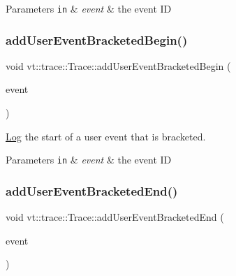 \begin{DoxyParams}[1]{Parameters}
\mbox{\tt in}  & {\em event} & the event ID \\
\hline
\end{DoxyParams}
\mbox{\label{structvt_1_1trace_1_1_trace_a1264ea508298bfeb6a6ef5e06d9214f9}} 
\subsubsection{\texorpdfstring{add\+User\+Event\+Bracketed\+Begin()}{addUserEventBracketedBegin()}}
{\footnotesize\ttfamily void vt\+::trace\+::\+Trace\+::add\+User\+Event\+Bracketed\+Begin (\begin{DoxyParamCaption}\item[{\hyperlink{namespacevt_1_1trace_a5908920d051c144c89f17c69ed262350}{User\+Event\+I\+D\+Type}}]{event }\end{DoxyParamCaption})}



\hyperlink{structvt_1_1trace_1_1_log}{Log} the start of a user event that is bracketed. 


\begin{DoxyParams}[1]{Parameters}
\mbox{\tt in}  & {\em event} & the event ID \\
\hline
\end{DoxyParams}
\mbox{\label{structvt_1_1trace_1_1_trace_a9ed44cd0fb5939013ae30de2aeb8aa0e}} 
\subsubsection{\texorpdfstring{add\+User\+Event\+Bracketed\+End()}{addUserEventBracketedEnd()}}
{\footnotesize\ttfamily void vt\+::trace\+::\+Trace\+::add\+User\+Event\+Bracketed\+End (\begin{DoxyParamCaption}\item[{\hyperlink{namespacevt_1_1trace_a5908920d051c144c89f17c69ed262350}{User\+Event\+I\+D\+Type}}]{event }\end{DoxyParamCaption})}



